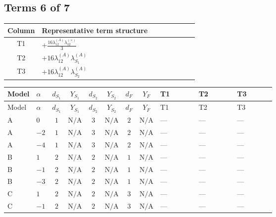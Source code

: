 \documentclass[8pt]{article}
\begin{document}
\begin{landscape}
\subsection*{Terms 6 of 7}
\begin{center}
\begin{tabular}{@{}c >{\raggedright\arraybackslash}p{0.82\linewidth}@{}}
\toprule
Column & Representative term structure \\
\midrule
T1 & \(\displaystyle +\frac{16 {\lambda_{12}^{(A)}} {\lambda_{12}^{(\times)}}}{3}\) \\
\midrule
T2 & \(\displaystyle +16 {\lambda_{12}^{(A)}} {\lambda_{S_1}^{(A)}}\) \\
\midrule
T3 & \(\displaystyle +16 {\lambda_{12}^{(A)}} {\lambda_{S_2}^{(A)}}\) \\
\midrule
\bottomrule
\end{tabular}
\end{center}
\smallskip
\tiny
\begin{longtable}{@{}llcccccc >{\raggedright\arraybackslash}p{0.21\linewidth} >{\raggedright\arraybackslash}p{0.21\linewidth} >{\raggedright\arraybackslash}p{0.21\linewidth}@{}}
\toprule
Model & $\alpha$ & $d_{S_1}$ & $Y_{S_1}$ & $d_{S_2}$ & $Y_{S_2}$ & $d_F$ & $Y_F$ & T1 & T2 & T3 \\
\midrule
\endfirsthead
\toprule
Model & $\alpha$ & $d_{S_1}$ & $Y_{S_1}$ & $d_{S_2}$ & $Y_{S_2}$ & $d_F$ & $Y_F$ & T1 & T2 & T3 \\
\midrule
\endhead
A & $0$ & $1$ & $\text{N/A}$ & $3$ & $\text{N/A}$ & $2$ & $\text{N/A}$ & --- & --- & --- \\
\midrule
A & $-2$ & $1$ & $\text{N/A}$ & $3$ & $\text{N/A}$ & $2$ & $\text{N/A}$ & --- & --- & --- \\
\midrule
A & $-4$ & $1$ & $\text{N/A}$ & $3$ & $\text{N/A}$ & $2$ & $\text{N/A}$ & --- & --- & --- \\
\midrule
B & $1$ & $2$ & $\text{N/A}$ & $2$ & $\text{N/A}$ & $1$ & $\text{N/A}$ & --- & --- & --- \\
\midrule
B & $-1$ & $2$ & $\text{N/A}$ & $2$ & $\text{N/A}$ & $1$ & $\text{N/A}$ & --- & --- & --- \\
\midrule
B & $-3$ & $2$ & $\text{N/A}$ & $2$ & $\text{N/A}$ & $1$ & $\text{N/A}$ & --- & --- & --- \\
\midrule
C & $1$ & $2$ & $\text{N/A}$ & $2$ & $\text{N/A}$ & $3$ & $\text{N/A}$ & --- & --- & --- \\
\midrule
C & $-1$ & $2$ & $\text{N/A}$ & $2$ & $\text{N/A}$ & $3$ & $\text{N/A}$ & --- & --- & --- \\

\end{longtable}
\end{landscape}
\end{document}
